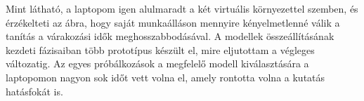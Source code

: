 Mint látható, a laptopom igen alulmaradt a két virtuális környezettel szemben, és érzékelteti az ábra, hogy saját munkaálláson mennyire kényelmetlenné válik a tanítás a várakozási idők meghosszabbodásával. A modellek összeállításának kezdeti fázisaiban több prototípus készült el, mire eljutottam a végleges változatig. Az egyes próbálkozások a megfelelő modell kiválasztására a laptopomon nagyon sok időt vett volna el, amely rontotta volna a kutatás hatásfokát is.
